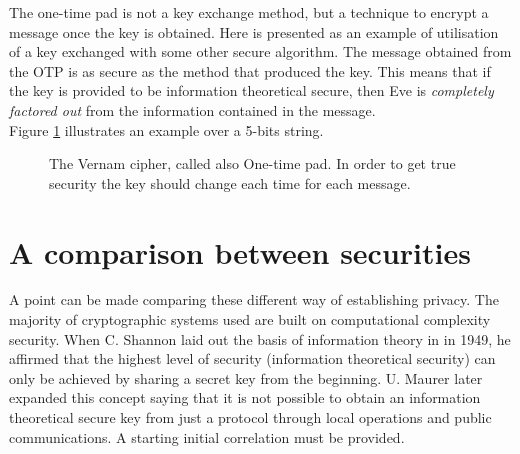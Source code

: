 		The one-time pad is not a key exchange method, but a technique to encrypt a message once the key is obtained.
		Here is presented as an example of utilisation of a key exchanged with some other secure algorithm. 
		The message obtained from the OTP is as secure as the method that produced the key.
		This means that if the key is provided to be information theoretical secure, then Eve is \emph{completely factored out} from the information contained in the message.\\
		Figure \ref{Fig:OTP} illustrates an example over a 5-bits string.
		
		\begin{figure}[h!]
			\centering
			
			\caption{The Vernam cipher, called also One-time pad. In order to get true security the key should change each time for each message.}
			\label{Fig:OTP}
		\end{figure}
\section{A comparison between securities}
    A point can be made comparing these different way of establishing privacy.
    The majority of cryptographic systems used are built on computational complexity security. 
	When C. Shannon laid out the basis of information theory in \cite{Shannon49} in 1949, he affirmed that the highest level of security (information theoretical security) can only be achieved by sharing a secret key from the beginning.
	 U. Maurer later expanded this concept saying that it is not possible to obtain an information theoretical secure key from just a protocol through local operations and public communications\cite{Maur93}. A starting initial correlation must be provided.\\
	 
